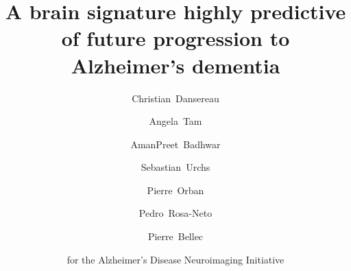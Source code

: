 \documentclass[authoryear]{elsarticle}
\begin{document}
\begin{frontmatter}
\title{A brain signature highly predictive of future progression to Alzheimer's dementia}

\author[a,b]{Christian~Dansereau}
\author[c]{Angela~Tam}
\author[a]{AmanPreet~Badhwar}
\author[c]{Sebastian~Urchs}
\author[a,e,f]{Pierre~Orban}
\author[d]{Pedro~Rosa-Neto}
\author[a,b]{Pierre~Bellec}
\author{for the Alzheimer's Disease Neuroimaging Initiative}




\address[a]{Centre de Recherche de l'Institut Universitaire de G\'eriatrie de Montr\'eal, Montr\'eal, CA}
\address[b]{D\'epartement d'Informatique et de recherche op\'erationnelle, Universit\'e de Montr\'eal, Montr\'eal,CA}
\address[c]{Integrated Program in Neuroscience, McGill University, Montr\'eal,CA}
\address[d]{Douglas Mental Health institute, McGill University, Montr\'eal,CA}
\address[e]{Centre de Recherche de l'Institut Universitaire en Sant\'e Mentale de Montr\'eal, Montr\'eal, CA}
\address[f]{D\'epartement de Psychiatrie, Universit\'e de Montr\'eal, Montr\'eal, CA}

%


\end{frontmatter}
\end{document}
